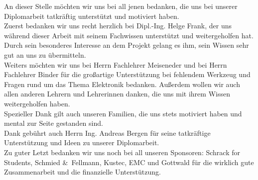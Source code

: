 
\begin{Danksagung}
An dieser Stelle möchten wir uns bei all jenen bedanken, die uns bei unserer Diplomarbeit tatkräftig unterstützt und motiviert haben. \\

Zuerst bedanken wir uns recht herzlich bei Dipl.-Ing. Helge Frank, der uns während dieser Arbeit mit seinem Fachwissen unterstützt und weitergeholfen hat. 
Durch sein besonderes Interesse an dem Projekt gelang es ihm, sein Wissen sehr gut an uns zu übermitteln. \\

Weiters möchten wir uns bei Herrn Fachlehrer Meiseneder und bei Herrn Fachlehrer Binder für die großartige Unterstützung bei fehlendem Werkzeug und Fragen 
rund um das Thema Elektronik bedanken. Außerdem wollen wir auch allen anderen Lehrern und Lehrerinnen danken, die uns mit ihrem Wissen weitergeholfen haben. \\

Spezieller Dank gilt auch unseren Familien, die uns stets motiviert haben und mental zur Seite gestanden sind. \\

Dank gebührt auch Herrn Ing. Andreas Bergen für seine tatkräftige Unterstützung und Ideen zu unserer Diplomarbeit. \\

Zu guter Letzt bedanken wir uns noch bei all unseren Sponsoren: Schrack for Students, Schmied \&\ Fellmann, Kustec, EMC und Gottwald für die wirklich gute Zusammenarbeit und die finanzielle Unterstützung. \\
\end{Danksagung}
\newpage

